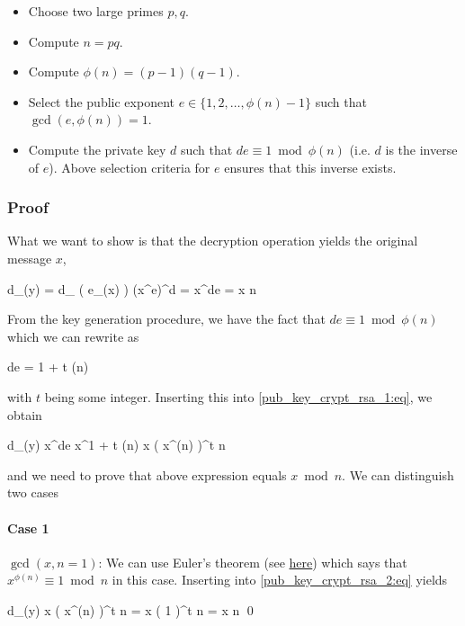 \begin{itemize}
	\item Choose two large primes $p,q$.

	\item Compute $n = pq$.

	\item Compute $\phi(n) =(p-1)(q-1)$.

	\item Select the public exponent $e \in \{1,2,\ldots,\phi(n)-1\}$ such that $\gcd(e,\phi(n))=1$.

	\item Compute the private key $d$ such that $de \equiv 1 \bmod \phi(n)$ (i.e. $d$ is the inverse of $e$). Above selection criteria for $e$ ensures that this inverse exists.

\end{itemize}

\subsubsection{Proof}

What we want to show is that the decryption operation yields the original message $x$,

\be\label{pub_key_crypt_rsa_1:eq}
d_{}(y) = d_{} \left( e_{}(x) \right) \equiv (x^e)^d = x^{de} = x \bmod n
\ee

From the key generation procedure, we have the fact that $de \equiv 1 \bmod \phi(n)$ which we can rewrite as

\bee
de = 1 + t \phi(n)
\eee

with $t$ being some integer. Inserting this into \eqref{pub_key_crypt_rsa_1:eq}, we obtain

\be\label{pub_key_crypt_rsa_2:eq}
d_{}(y) \equiv x^{de} \equiv x^{1 + t \phi(n)} \equiv x \left( x^{\phi(n)} \right)^t \bmod n
\ee

and we need to prove that above expression equals $x \bmod n$. We can distinguish two cases

\paragraph{Case 1} $\gcd(x,n=1)$: We can use Euler's theorem (see \hyperref[2017-05-08:entry]{here}) which says that $x^{\phi(n)} \equiv 1 \bmod n$ in this case. Inserting into \eqref{pub_key_crypt_rsa_2:eq} yields

\bee
d_{}(y) \equiv x \left( x^{\phi(n)} \right)^t \bmod n = x \left( 1 \right)^t \bmod n = x \bmod n \qed
\eee

